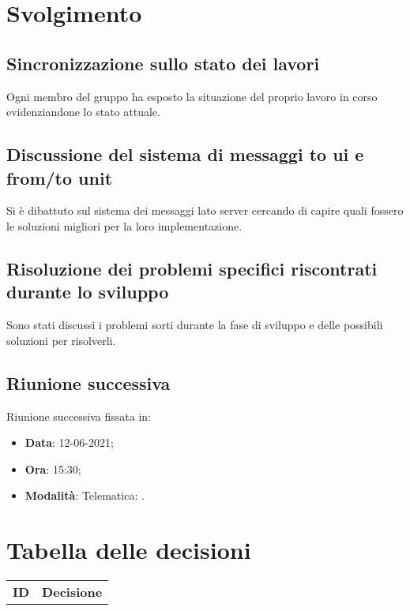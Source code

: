 \documentclass[]{article}
\begin{document}
	\newpage

	\section{Svolgimento}
		\subsection{Sincronizzazione sullo stato dei lavori}
		Ogni membro del gruppo ha esposto la situazione del proprio lavoro in corso evidenziandone lo stato attuale.\\
		
		\subsection{Discussione del sistema di messaggi to ui e from/to unit}
		Si è dibattuto sul sistema dei messaggi lato server cercando di capire quali fossero le soluzioni migliori per la loro implementazione. \\
		
		\subsection{Risoluzione dei problemi specifici riscontrati durante lo sviluppo}
		Sono stati discussi i problemi sorti durante la fase di sviluppo e delle possibili soluzioni per risolverli. \\
		
		\subsection{Riunione successiva}
		Riunione successiva fissata in:
		\begin{itemize}
			\item \textbf{Data}: 12-06-2021;
			\item \textbf{Ora}: 15:30;
			\item \textbf{Modalità}: Telematica: .
		\end{itemize}
	
	
\section{Tabella delle decisioni}

\begin{table} [h!]
	\begin{center}
		\begin{tabular} { m{2cm} m{14cm} }
			\rowcolor{lightgray}
			\textbf{ID} & \textbf{Decisione}\\
		\end{tabular}
	\end{center}
\end{table}
\end{document}
